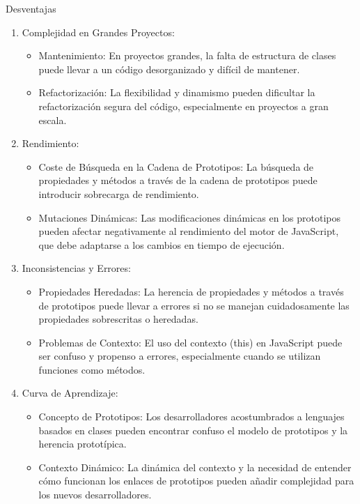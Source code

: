 \documentclass{article}
\begin{document}
Desventajas

\begin{enumerate}
      \item Complejidad en Grandes Proyectos:
            \begin{itemize}
                  \item Mantenimiento: En proyectos grandes, la falta de estructura de clases puede llevar a un código
                        desorganizado y difícil de mantener.
                  \item Refactorización: La flexibilidad y dinamismo pueden dificultar la refactorización segura del
                        código, especialmente en proyectos a gran escala.
            \end{itemize}
      \item Rendimiento:
            \begin{itemize}
                  \item Coste de Búsqueda en la Cadena de Prototipos: La búsqueda de propiedades y métodos a través de la
                        cadena de prototipos puede introducir sobrecarga de rendimiento.
                  \item Mutaciones Dinámicas: Las modificaciones dinámicas en los prototipos pueden afectar negativamente
                        al rendimiento del motor de JavaScript, que debe adaptarse a los cambios en tiempo de ejecución.
            \end{itemize}
      \item Inconsistencias y Errores:
            \begin{itemize}
                  \item Propiedades Heredadas: La herencia de propiedades y métodos a través de prototipos puede llevar a
                        errores si no se manejan cuidadosamente las propiedades sobrescritas o heredadas.
                  \item Problemas de Contexto: El uso del contexto (this) en JavaScript puede ser confuso y propenso a
                        errores, especialmente cuando se utilizan funciones como métodos.
            \end{itemize}
      \item Curva de Aprendizaje:
            \begin{itemize}
                  \item Concepto de Prototipos: Los desarrolladores acostumbrados a lenguajes basados en clases pueden
                        encontrar confuso el modelo de prototipos y la herencia prototípica.
                  \item Contexto Dinámico: La dinámica del contexto y la necesidad de entender cómo funcionan los enlaces
                        de prototipos pueden añadir complejidad para los nuevos desarrolladores.
            \end{itemize}
\end{enumerate}
\end{document}
